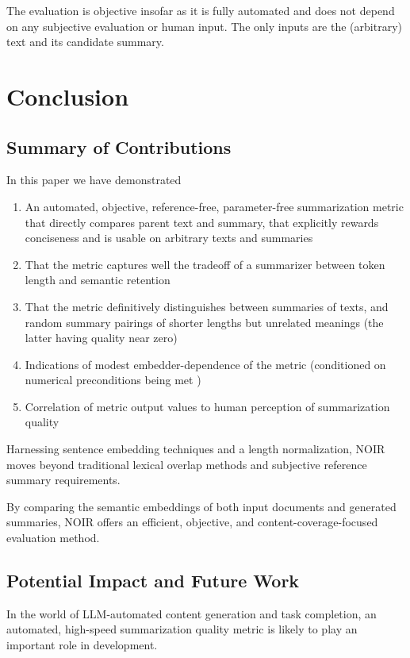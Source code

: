 \documentclass{article}
\begin{document}
{The evaluation is objective insofar as it is fully automated and does not depend on any subjective evaluation or human input.
The only inputs are the (arbitrary) text and its candidate summary.

\section{Conclusion}

\subsection{Summary of Contributions}

In this paper we have demonstrated 

\begin{enumerate}
\item An automated, objective, reference-free, parameter-free summarization metric that directly compares parent text and summary, that explicitly rewards conciseness and is usable on arbitrary texts and summaries
\item That the metric captures well the tradeoff of a summarizer between token length and semantic retention
\item That the metric definitively distinguishes between summaries of texts, and random summary pairings of shorter lengths but unrelated meanings (the latter having quality near zero)
\item Indications of modest embedder-dependence of the metric (conditioned on numerical preconditions being met )
\item Correlation of metric output values to human perception of summarization quality
\end{enumerate}

Harnessing sentence embedding techniques and a length normalization, NOIR moves beyond traditional lexical overlap methods and subjective reference summary requirements. 

By comparing the semantic embeddings of both input documents and generated summaries, NOIR offers an efficient, objective, and content-coverage-focused evaluation method. 

\subsection{Potential Impact and Future Work}

In the world of LLM-automated content generation and task completion, an automated, high-speed summarization quality metric is likely to play an important role in development.  

}
\end{document}
